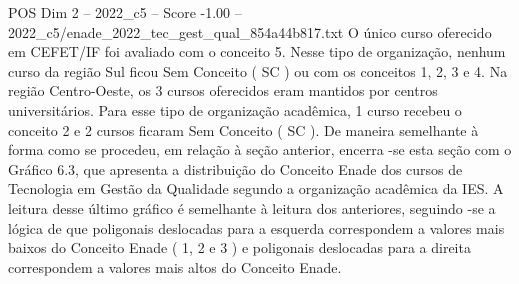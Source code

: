 \begin{textsample}{POS Dim 2 – 2022\_c5 – Score -1.00 – 2022\_c5/enade\_2022\_tec\_gest\_qual\_854a44b817.txt}
O único curso oferecido em CEFET/IF foi avaliado com o conceito 5.
Nesse tipo de organização, nenhum curso da região Sul ficou Sem Conceito ( SC ) ou com os conceitos 1, 2, 3 e 4.
Na região Centro-Oeste, os 3 cursos oferecidos eram mantidos por centros universitários.
Para esse tipo de organização acadêmica, 1 curso recebeu o conceito 2 e 2 cursos ficaram Sem Conceito ( SC ).
De maneira semelhante à forma como se procedeu, em relação à seção anterior, encerra -se esta seção com o Gráfico 6.3, que apresenta a distribuição do Conceito Enade dos cursos de Tecnologia em Gestão da Qualidade segundo a organização acadêmica da IES.
A leitura desse último gráfico é semelhante à leitura dos anteriores, seguindo -se a lógica de que poligonais deslocadas para a esquerda correspondem a valores mais baixos do Conceito Enade ( 1, 2 e 3 ) e poligonais deslocadas para a direita correspondem a valores mais altos do Conceito Enade.

\end{textsample}
